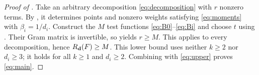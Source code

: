 \begin{proof}[Proof of ]
Take an arbitrary decomposition \eqref{eq:decomposition} with $r$
nonzero terms. By , it determines
points and nonzero weights satisfying \eqref{eq:moments} with
$\beta_i=1/d_i$. Construct the $M$ test functions
\eqref{eq:B0}--\eqref{eq:Bi} and choose $t$ using
. Their Gram matrix is invertible, so
 yields $r\ge M$. This applies to every
decomposition, hence $R_{\mathbf d}(F)\ge M$. This lower bound uses
neither $k\ge2$ nor $d_i\ge3$; it holds for all $k\ge1$ and
$d_i\ge2$. Combining with
\eqref{eq:upper} proves \eqref{eq:main}.
\end{proof}
